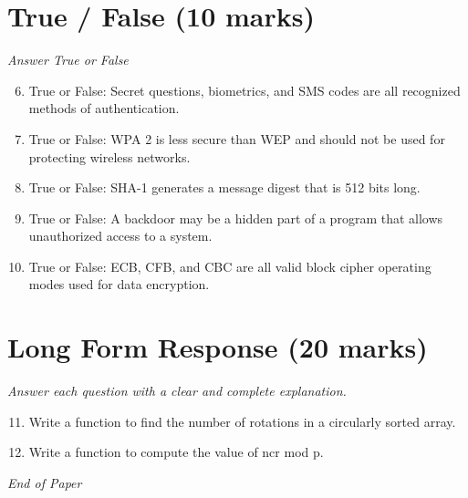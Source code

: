 \documentclass[12pt]{article}
\begin{document}
\section*{True / False (10 marks)}
\textit{Answer True or False}
\begin{enumerate}[label=\arabic*.]
\setcounter{enumi}{5}
\item True or False: Secret questions, biometrics, and SMS codes are all recognized methods of authentication.
\item True or False: WPA 2 is less secure than WEP and should not be used for protecting wireless networks.
\item True or False: SHA-1 generates a message digest that is 512 bits long.
\item True or False: A backdoor may be a hidden part of a program that allows unauthorized access to a system.
\item True or False: ECB, CFB, and CBC are all valid block cipher operating modes used for data encryption.
\end{enumerate}

\section*{Long Form Response (20 marks)}
\textit{Answer each question with a clear and complete explanation.}
\begin{enumerate}[label=\arabic*.]
\setcounter{enumi}{10}
\item Write a function to find the number of rotations in a circularly sorted array.
\item Write a function to compute the value of ncr mod p.
\end{enumerate}

\vfill
\noindent\textit{End of Paper}
\end{document}
